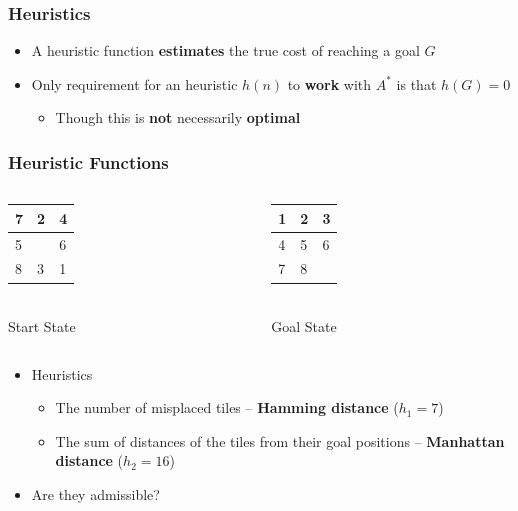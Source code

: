 \documentclass{beamer}
\begin{document}
	\begin{frame}[c]\frametitle{Heuristics}
		\begin{itemize}
			\item A heuristic function \textbf{estimates} the true cost of reaching a goal $G$
			\item Only requirement for an heuristic $h(n)$ to \textbf{work} with $A^{*}$ is that $h(G)=0$
			\begin{itemize}
				\item Though this is \textbf{not} necessarily \textbf{optimal}
			\end{itemize}
		\end{itemize}
	\end{frame}

\newcommand\puzzle[9]{
			{\Large
			\begin{tabular}{|m{.5em}|m{.5em}|m{.5em}|}
			\hline
			#1 & #2 & #3\\
			\hline
			#4 & #5 & #6\\
			\hline
			#7 & #8 & #9\\
			\hline
			\end{tabular}
			}
}

	\begin{frame}[c]\frametitle{Heuristic Functions}
		\begin{columns}
		\begin{column}{0.5\textwidth}
			\begin{center}
				\puzzle{7}{2}{4}
				       {5}{ }{6} 
				       {8}{3}{1}\\[1em]
				Start State
			\end{center}
		\end{column}
		\begin{column}{0.5\textwidth}
			\begin{center}
				\puzzle{1}{2}{3}
				       {4}{5}{6} 
				       {7}{8}{ }\\[1em]
				Goal State
			\end{center}
		\end{column}
		\end{columns}
		\begin{itemize}
			\item Heuristics
			\begin{itemize}
				\item<2-> The number of misplaced tiles -- \textbf{Hamming distance} ($h_1 = 7$)
				\item<2-> The sum of distances of the tiles from their goal positions -- \textbf{Manhattan distance} ($h_2 = 16$)  
			\end{itemize}
			\item<2-> Are they admissible?
		\end{itemize}
	\end{frame}
\end{document}
